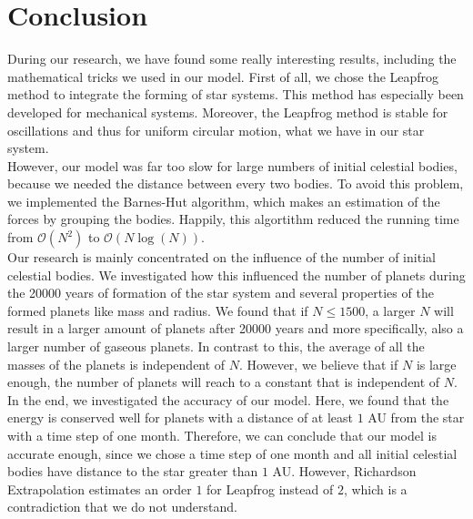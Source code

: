 \section{Conclusion}

During our research, we have found some really interesting results, including the mathematical tricks we used in our model.
First of all, we chose the Leapfrog method to integrate the forming of star systems.
This method has especially been developed for mechanical systems.
Moreover, the Leapfrog method is stable for oscillations and thus for uniform circular motion, what we have in our star system.\\

However, our model was far too slow for large numbers of initial celestial bodies, because we needed the distance between every two bodies.
To avoid this problem, we implemented the Barnes-Hut algorithm, which makes an estimation of the forces by grouping the bodies.
Happily, this algortithm reduced the running time from $\mathcal{O}(N^2)$ to $\mathcal{O}(N\log(N))$.\\

Our research is mainly concentrated on the influence of the number of initial celestial bodies.
We investigated how this influenced the number of planets during the 20000 years of formation of the star system and several properties of the formed planets like mass and radius.
We found that if $N\leq 1500$, a larger $N$ will result in a larger amount of planets after 20000 years and more specifically, also a larger number of gaseous planets. In contrast to this, the average of all the masses of the planets is independent of $N$. However, we believe that if $N$ is large enough, the number of planets will reach to a constant that is independent of $N$. \\

In the end, we investigated the accuracy of our model.
Here, we found that the energy is conserved well for planets with a distance of at least $1$ AU from the star with a time step of one month.
Therefore, we can conclude that our model is accurate enough, since we chose a time step of one month and all initial celestial bodies have distance to the star greater than $1$ AU. However, Richardson Extrapolation estimates an order $1$ for Leapfrog instead of $2$, which is a contradiction that we do not understand.





